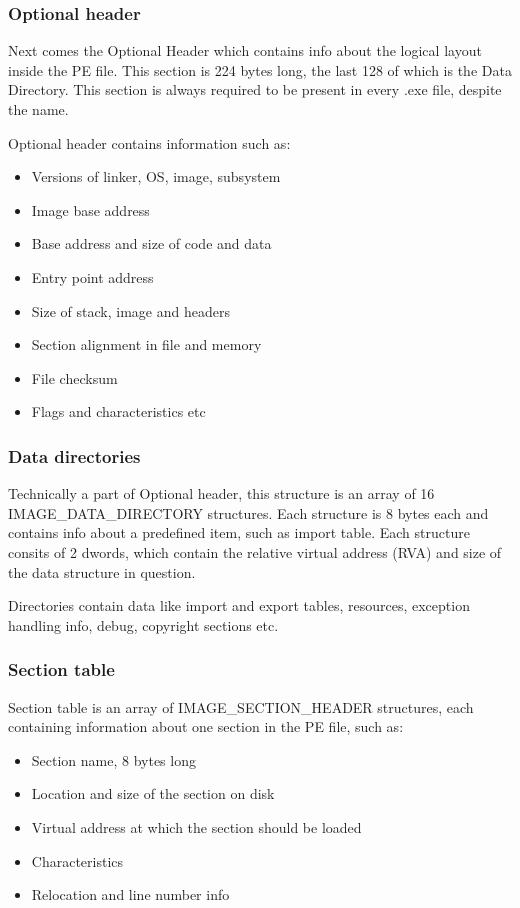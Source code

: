 \documentclass[a4paper,12pt]{article}
\begin{document}
\subsubsection{Optional header}
Next comes the Optional Header which contains info about the logical layout
inside the PE file. This section is 224 bytes long, the last 128 of which
is the Data Directory. This section is always required to be present in every
.exe file, despite the name.

Optional header contains information such as:

\begin{itemize}
\item Versions of linker, OS, image, subsystem
\item Image base address
\item Base address and size of code and data
\item Entry point address
\item Size of stack, image and headers
\item Section alignment in file and memory
\item File checksum
\item Flags and characteristics etc
\end{itemize}

\subsubsection{Data directories}
Technically a part of Optional header, this structure is an array of 16
IMAGE\_DATA\_DIRECTORY structures. Each structure is 8 bytes each and
contains info about a predefined item, such as import table. Each structure
consits of 2 dwords, which contain the relative virtual address (RVA) and
size of the data structure in question.

Directories contain data like import and export tables, resources, exception
handling info, debug, copyright sections etc.

\subsubsection{Section table}
Section table is an array of IMAGE\_SECTION\_HEADER structures, each containing
information about one section in the PE file, such as:
\begin{itemize}
\item Section name, 8 bytes long
\item Location and size of the section on disk
\item Virtual address at which the section should be loaded
\item Characteristics
\item Relocation and line number info
\end{itemize}
\end{document}
